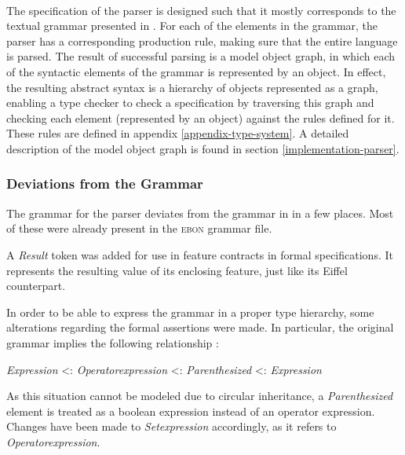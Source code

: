 \paragraph{}
The specification of the parser is designed such that it mostly corresponds to the textual \bon{} grammar presented in \cite{walden1995}. For each of the elements in the grammar, the parser has a corresponding production rule, making sure that the entire language is parsed. The result of successful parsing is a model object graph, in which each of the syntactic elements of the grammar is represented by an object. In effect, the resulting abstract syntax is a hierarchy of objects represented as a graph, enabling a type checker to check a \bon{} specification by traversing this graph and checking each element (represented by an object) against the rules defined for it. These rules are defined in appendix \ref{appendix-type-system}. A detailed description of the model object graph is found in section \ref{implementation-parser}.

\subsubsection{Deviations from the Grammar}
\label{design-grammar-deviations}
The grammar for the parser deviates from the grammar in \cite{walden1995} in a few places. Most of these were already present in the \textsc{ebon} grammar file.

A \textit{Result} token was added for use in feature contracts in formal specifications. It represents the resulting value of its enclosing feature, just like its Eiffel counterpart.

In order to be able to express the grammar in a proper type hierarchy, some alterations regarding the formal assertions were made. In particular, the original grammar implies the following relationship \cite[p.~357]{walden1995}:
\begin{center}
\textit{Expression} \textless : \textit{Operator\textunderscore expression} \textless : \textit{Parenthesized} \textless : \textit{Expression}
\end{center}
As this situation cannot be modeled due to circular inheritance, a \textit{Parenthesized} element is treated as a boolean expression instead of an operator expression. Changes have been made to \textit{Set\textunderscore expression} accordingly, as it refers to \textit{Operator\textunderscore expression}.

